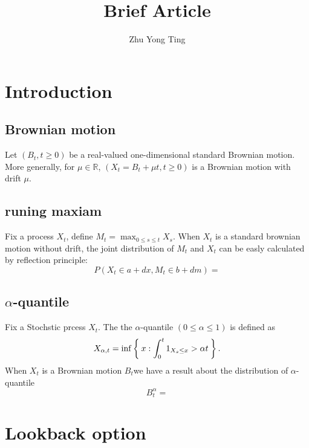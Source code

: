 \documentclass[11pt]{amsart}
\title{Brief Article}
\author{Zhu Yong Ting}
\def\bR{{\mathbb{R}}}
\begin{document}
\maketitle
\section{Introduction}
\subsection{Brownian motion}
Let $(B_t, t\geq 0)$  be a real-valued one-dimensional standard Brownian motion.
More generally, 
for $ \mu \in \bR$, $(X_t = B_t + \mu t, t \geq 0)$ 
is a Brownian motion with drift $\mu$. 

\subsection{runing maxiam}
Fix a process $X_t$, define $M_t = \max_{0\leq s\leq t} X_s $. 
When $X_t$ is a standard brownian motion without drift, 
the joint distribution of $M_t$ and $X_t$
 can be easly calculated by reflection principle\cite{}:
\[
P(X_t \in a+dx, M_t \in b+dm) =  
\]

\subsection{$\alpha$-quantile}
Fix a Stochstic prcess $X_t$.
The the $\alpha$-quantile $( 0 \leq \alpha \leq 1)$ 
is defined as 
\[
X_{\alpha,t} = \inf\Set{x:\int_0^t 1_{X_s\leq x} > \alpha t}.
\]
When $X_{t}$ is a Brownian motion $B_t$we have a result about the distribution
of $\alpha$-quantile
\[
B_t^\alpha = 
\]




\subsection{}


\section{Lookback option}


{}

\end{document}
